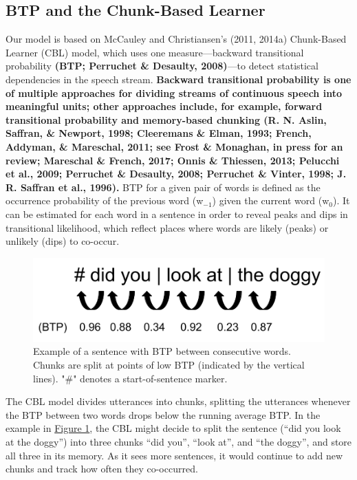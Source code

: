 \documentclass[man,mask,floatsintext]{apa6}
\begin{document}
\subsection{BTP and the Chunk-Based
Learner}\label{btp-and-the-chunk-based-learner}

Our model is based on McCauley and Christiansen's (2011, 2014a)
Chunk-Based Learner (CBL) model, which uses one measure---backward
transitional probability \textbf{(BTP; Perruchet \& Desaulty,
2008)}---to detect statistical dependencies in the speech stream.
\textbf{Backward transitional probability is one of multiple approaches
for dividing streams of continuous speech into meaningful units; other
approaches include, for example, forward transitional probability and
memory-based chunking (R. N. Aslin, Saffran, \& Newport, 1998;
Cleeremans \& Elman, 1993; French, Addyman, \& Mareschal, 2011; see
Frost \& Monaghan, in press for an review; Mareschal \& French, 2017;
Onnis \& Thiessen, 2013; Pelucchi et al., 2009; Perruchet \& Desaulty,
2008; Perruchet \& Vinter, 1998; J. R. Saffran et al., 1996).} BTP for a
given pair of words is defined as the occurrence probability of the
previous word (w\(_{-1}\)) given the current word (w\(_0\)). It can be
estimated for each word in a sentence in order to reveal peaks and dips
in transitional likelihood, which reflect places where words are likely
(peaks) or unlikely (dips) to co-occur.

\begin{figure}

{\centering \includegraphics[width=0.95\linewidth]{images/chunking_mechanism} 

}

\caption{Example of a sentence with BTP between consecutive words. Chunks are split at points of low BTP (indicated by the vertical lines). "\#" denotes a start-of-sentence marker.}\label{fig:fig1}
\end{figure}

The CBL model divides utterances into chunks, splitting the utterances
whenever the BTP between two words drops below the running average BTP.
In the example in \protect\hyperlink{fig1}{Figure 1}, the CBL might
decide to split the sentence (\enquote{did you look at the doggy}) into
three chunks \enquote{did you}, \enquote{look at}, and \enquote{the
doggy}, and store all three in its memory. As it sees more sentences, it
would continue to add new chunks and track how often they co-occurred.
\end{document}
